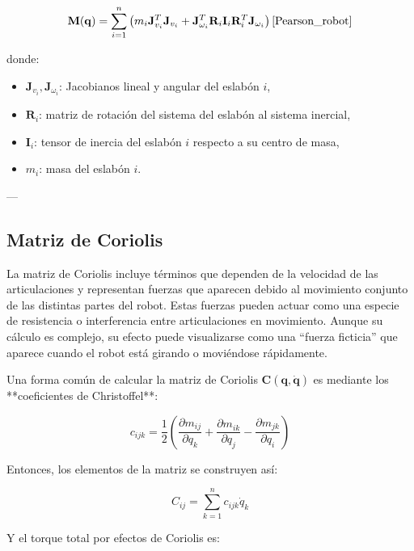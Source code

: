 \begin{equation}
	\mathbf{M}(\mathbf{q}) = \sum_{i=1}^n \left( m_i \mathbf{J}_{v_i}^T \mathbf{J}_{v_i} + \mathbf{J}_{\omega_i}^T \mathbf{R}_i \mathbf{I}_i \mathbf{R}_i^T \mathbf{J}_{\omega_i} \right)
	\text{\cite{Pearson_robot}}
\end{equation}

donde:
\begin{itemize}
	\item \(\mathbf{J}_{v_i}, \mathbf{J}_{\omega_i}\): Jacobianos lineal y angular del eslabón \(i\),
	\item \(\mathbf{R}_i\): matriz de rotación del sistema del eslabón al sistema inercial,
	\item \(\mathbf{I}_i\): tensor de inercia del eslabón \(i\) respecto a su centro de masa,
	\item \(m_i\): masa del eslabón \(i\).
\end{itemize}

---

\subsection{Matriz de Coriolis}

La matriz de Coriolis incluye términos que dependen de la velocidad de las articulaciones y representan fuerzas que aparecen debido al movimiento conjunto de las distintas partes del robot. Estas fuerzas pueden actuar como una especie de resistencia o interferencia entre articulaciones en movimiento. Aunque su cálculo es complejo, su efecto puede visualizarse como una “fuerza ficticia” que aparece cuando el robot está girando o moviéndose rápidamente.

Una forma común de calcular la matriz de Coriolis \(\mathbf{C}(\mathbf{q}, \dot{\mathbf{q}})\) es mediante los **coeficientes de Christoffel**:

\begin{equation}
	c_{ijk} = \frac{1}{2} \left( \frac{\partial m_{ij}}{\partial q_k} + \frac{\partial m_{ik}}{\partial q_j} - \frac{\partial m_{jk}}{\partial q_i} \right)
\end{equation}

Entonces, los elementos de la matriz se construyen así:

\begin{equation}
	C_{ij} = \sum_{k=1}^n c_{ijk} \dot{q}_k
\end{equation}

Y el torque total por efectos de Coriolis es:


